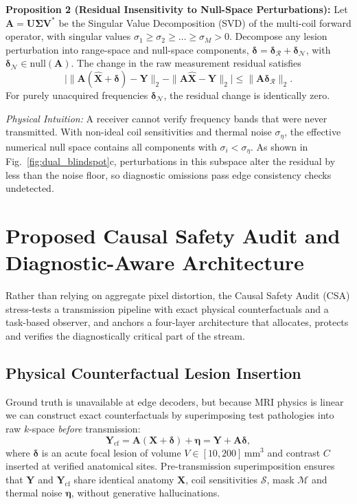 \documentclass[conference]{IEEEtran}
\begin{document}
\textbf{Proposition 2 (Residual Insensitivity to Null-Space Perturbations):} Let $\mathbf{A} = \mathbf{U}\boldsymbol{\Sigma}\mathbf{V}^*$ be the Singular Value Decomposition (SVD) of the multi-coil forward operator, with singular values $\sigma_1 \ge \sigma_2 \ge \dots \ge \sigma_M > 0$. Decompose any lesion perturbation into range-space and null-space components, $\boldsymbol{\delta} = \boldsymbol{\delta}_{\mathcal{R}} + \boldsymbol{\delta}_{\mathcal{N}}$, with $\boldsymbol{\delta}_{\mathcal{N}} \in \text{null}(\mathbf{A})$. The change in the raw measurement residual satisfies
\begin{equation}
\big| \|\mathbf{A}(\hat{\mathbf{X}} + \boldsymbol{\delta}) - \mathbf{Y}\|_2 - \|\mathbf{A}\hat{\mathbf{X}} - \mathbf{Y}\|_2 \big| \le \|\mathbf{A}\boldsymbol{\delta}_{\mathcal{R}}\|_2 .
\label{eq:null_bound}
\end{equation}
For purely unacquired frequencies $\boldsymbol{\delta}_{\mathcal{N}}$, the residual change is identically zero.

\textit{Physical Intuition:} A receiver cannot verify frequency bands that were never transmitted. With non-ideal coil sensitivities and thermal noise $\sigma_\eta$, the effective numerical null space contains all components with $\sigma_i < \sigma_\eta$. As shown in Fig.~\ref{fig:dual_blindspot}c, perturbations in this subspace alter the residual by less than the noise floor, so diagnostic omissions pass edge consistency checks undetected.

\section{Proposed Causal Safety Audit and Diagnostic-Aware Architecture}
\label{sec:method}

Rather than relying on aggregate pixel distortion, the Causal Safety Audit (CSA) stress-tests a transmission pipeline with exact physical counterfactuals and a task-based observer, and anchors a four-layer architecture that allocates, protects and verifies the diagnostically critical part of the stream.

\subsection{Physical Counterfactual Lesion Insertion}
Ground truth is unavailable at edge decoders, but because MRI physics is linear we can construct exact counterfactuals by superimposing test pathologies into raw $k$-space \emph{before} transmission:
\begin{equation}
\mathbf{Y}_{\text{cf}} = \mathbf{A}(\mathbf{X} + \boldsymbol{\delta}) + \boldsymbol{\eta} = \mathbf{Y} + \mathbf{A}\boldsymbol{\delta},
\label{eq:linear_cf}
\end{equation}
where $\boldsymbol{\delta}$ is an acute focal lesion of volume $V \in [10, 200]\,\text{mm}^3$ and contrast $C$ inserted at verified anatomical sites. Pre-transmission superimposition ensures that $\mathbf{Y}$ and $\mathbf{Y}_{\text{cf}}$ share identical anatomy $\mathbf{X}$, coil sensitivities $\mathcal{S}$, mask $\mathcal{M}$ and thermal noise $\boldsymbol{\eta}$, without generative hallucinations.
\end{document}
